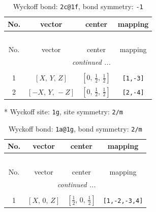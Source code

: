 \documentclass[fleqn,8pt]{jsarticle}
\begin{document}
\begin{longtable}{cccc}
\caption{Wyckoff bond: {\tt 2c@1f}, bond symmetry: {\tt -1}}
 \\
 \hline \hline
No. & vector & center & mapping \\ \hline \endfirsthead

\multicolumn{3}{l}{\tablename\ \thetable{}} \\
 \hline \hline
No. & vector & center & mapping \\ \hline \endhead

 \hline \hline
\multicolumn{3}{r}{\footnotesize\it continued ...} \\ \endfoot

 \hline \hline
\multicolumn{3}{r}{} \\ \endlastfoot

1 & $\left[ X,\, Y,\, Z \right]$ & $\left[ 0,\, \frac{1}{2},\, \frac{1}{2} \right]$ & {\tt [1,-3]} \\ \hline
2 & $\left[ - X,\, Y,\, - Z \right]$ & $\left[ 0,\, \frac{1}{2},\, \frac{1}{2} \right]$ & {\tt [2,-4]} \\
\end{longtable}
* Wyckoff site: {\tt 1g}, site symmetry: {\tt 2/m}
\renewcommand{\arraystretch}{1.2}
\begin{longtable}{cccc}
\caption{Wyckoff bond: {\tt 1a@1g}, bond symmetry: {\tt 2/m}}
 \\
 \hline \hline
No. & vector & center & mapping \\ \hline \endfirsthead

\multicolumn{3}{l}{\tablename\ \thetable{}} \\
 \hline \hline
No. & vector & center & mapping \\ \hline \endhead

 \hline \hline
\multicolumn{3}{r}{\footnotesize\it continued ...} \\ \endfoot

 \hline \hline
\multicolumn{3}{r}{} \\ \endlastfoot

1 & $\left[ X,\, 0,\, Z \right]$ & $\left[ \frac{1}{2},\, 0,\, \frac{1}{2} \right]$ & {\tt [1,-2,-3,4]} \\
\end{longtable}
\renewcommand{\arraystretch}{1.2}
\end{document}
